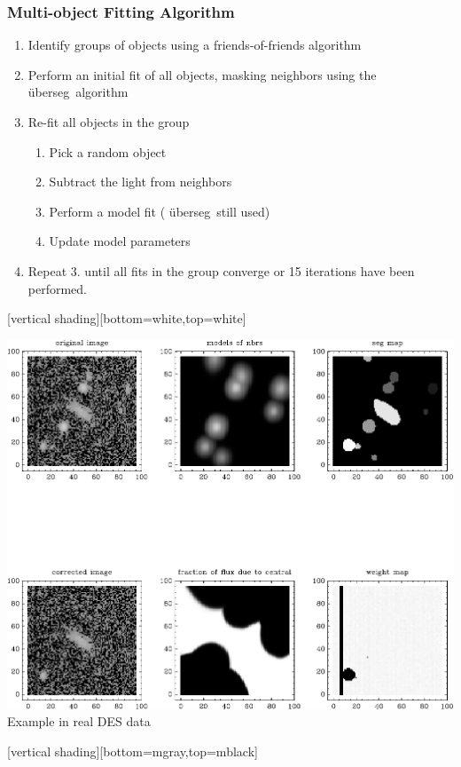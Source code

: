 \documentclass{beamer}
\newcommand{\uberseg}{{\color{lightsteelblue} {\"u}berseg}}
\begin{document}
\frame
{

    \frametitle{Multi-object Fitting Algorithm}

    \begin{enumerate}
        \item Identify groups of objects using a friends-of-friends algorithm

        \item Perform an initial fit of all objects, masking neighbors using
            the \uberseg\ algorithm

        \item Re-fit all objects in the group
            \begin{enumerate}
                \item Pick a random object
                \item Subtract the light from neighbors
                \item Perform a model fit (\uberseg\ still used)
                \item Update model parameters

            \end{enumerate}
        \item Repeat 3. until all fits in the group converge or 15 iterations have been performed.
    \end{enumerate}

}

[vertical shading][bottom=white,top=white]
\frame
{

    \begin{center}
        \includegraphics[width=0.9\columnwidth]{mb-cm-max-nbrs-band0-icut1.pdf}
        \newline
        {\color{black} Example in real DES data}
    \end{center}


}
    [vertical shading][bottom=mgray,top=mblack]
\end{document}
